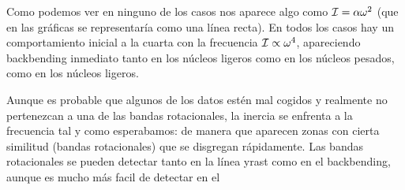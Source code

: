 \begin{texercise}
\begin{center}
    \end{center}
    Como podemos ver en ninguno de los casos nos aparece algo como $\mathcal{I} = \alpha \omega^2$ (que en las gráficas se representaría como una línea recta). En todos los casos hay un comportamiento  inicial a la cuarta con la frecuencia $\mathcal{I} \propto \omega^4$, apareciendo backbending inmediato tanto en los núcleos ligeros como en los núcleos pesados, como en los núcleos ligeros.

    Aunque es probable que algunos de los datos estén mal cogidos y realmente no pertenezcan a una de las bandas rotacionales, la inercia se enfrenta a la frecuencia tal y como esperabamos: de manera que aparecen zonas con cierta similitud (bandas rotacionales) que se disgregan rápidamente. Las bandas rotacionales se pueden detectar tanto en la línea yrast como en el backbending, aunque es mucho más facil de detectar en el 


\end{texercise}




